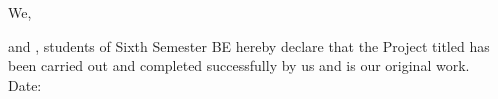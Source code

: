 \begin{spacing}{1.5}



We, {\textbf{\printStuNameA } and \textbf{\printStuNameB }, students of Sixth Semester BE hereby declare that the Project titled {\textbf{\textit{\printTitle}}} has been carried out and completed successfully by us and is our original work. \\
Date:


}
\end{spacing}
